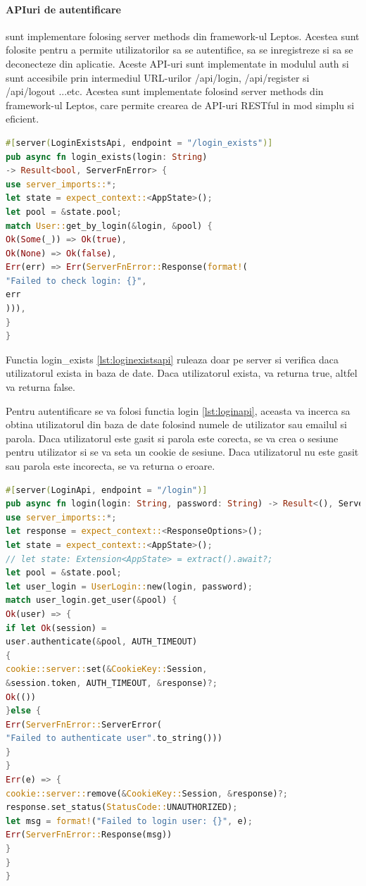 \documentclass[titlepage,12pt]{article}
\DeclareRobustCommand{\code}[1]{{\ttfamily\small #1}}
\begin{document}
\paragraph{API\-uri de autentificare} sunt implementare folosing server methods din framework-ul Leptos. Acestea sunt folosite pentru a permite utilizatorilor sa se autentifice, sa se inregistreze si sa se deconecteze din aplicatie. Aceste API-uri sunt implementate in modulul \code{auth} si sunt accesibile prin intermediul URL-urilor \code{/api/login}, \code{/api/register} si \code{/api/logout} ...etc. Acestea sunt implementate folosind server methods din framework-ul Leptos, care permite crearea de API-uri RESTful in mod simplu si eficient.

\begin{lstlisting}[language=Rust,caption={API pentru verificarea existentei utilizatorului},label={lst:loginexistsapi}]
#[server(LoginExistsApi, endpoint = "/login_exists")]
pub async fn login_exists(login: String)
-> Result<bool, ServerFnError> {
use server_imports::*;
let state = expect_context::<AppState>();
let pool = &state.pool;
match User::get_by_login(&login, &pool) {
Ok(Some(_)) => Ok(true),
Ok(None) => Ok(false),
Err(err) => Err(ServerFnError::Response(format!(
"Failed to check login: {}",
err
))),
}
}
\end{lstlisting}
Functia \code{login\_exists} \cref{lst:loginexistsapi} ruleaza doar pe server si verifica daca utilizatorul exista in baza de date. Daca utilizatorul exista, va returna \code{true}, altfel va returna \code{false}.


Pentru autentificare se va folosi functia \code{login} \cref{lst:loginapi}, aceasta va incerca sa obtina utilizatorul din baza de date folosind numele de utilizator sau emailul si parola. Daca utilizatorul este gasit si parola este corecta, se va crea o sesiune pentru utilizator si se va seta un cookie de sesiune. Daca utilizatorul nu este gasit sau parola este incorecta, se va returna o eroare.
\begin{lstlisting}[language=Rust,caption={API pentru autentificare},label={lst:loginapi}]
#[server(LoginApi, endpoint = "/login")]
pub async fn login(login: String, password: String) -> Result<(), ServerFnError> {
use server_imports::*;
let response = expect_context::<ResponseOptions>();
let state = expect_context::<AppState>();
// let state: Extension<AppState> = extract().await?;
let pool = &state.pool;
let user_login = UserLogin::new(login, password);
match user_login.get_user(&pool) {
Ok(user) => {
if let Ok(session) =
user.authenticate(&pool, AUTH_TIMEOUT)
{
cookie::server::set(&CookieKey::Session,
&session.token, AUTH_TIMEOUT, &response)?;
Ok(())
}else {
Err(ServerFnError::ServerError(
"Failed to authenticate user".to_string()))
}
}
Err(e) => {
cookie::server::remove(&CookieKey::Session, &response)?;
response.set_status(StatusCode::UNAUTHORIZED);
let msg = format!("Failed to login user: {}", e);
Err(ServerFnError::Response(msg))
}
}
}
\end{lstlisting}
\end{document}
